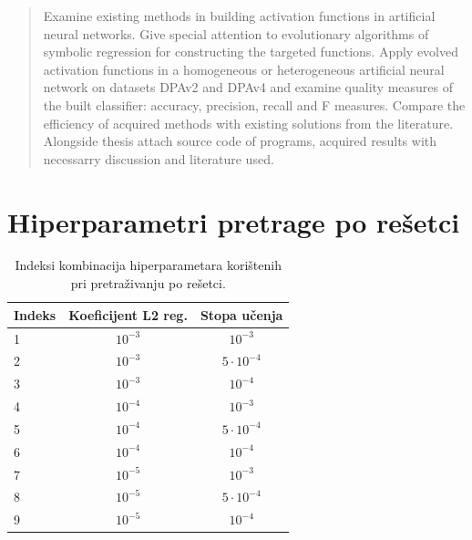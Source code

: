 \documentclass[times, utf8, numeric, diplomski]{fer}
\begin{document}
\begin{abstract}
Examine existing methods in building activation functions in artificial neural networks. Give special attention to evolutionary algorithms of symbolic regression for constructing the targeted functions. Apply evolved activation functions in a homogeneous or heterogeneous artificial neural network on datasets DPAv2 and DPAv4 and examine quality measures of the built classifier: accuracy, precision, recall and F measures. Compare the efficiency of acquired methods with existing solutions from the literature. Alongside thesis attach source code of programs, acquired results with necessarry discussion and literature used.

\end{abstract}

\iffalse %
\appendix
\chapter{Hiperparametri pretrage po rešetci}
\label{app:grid_hp}

\begin{table}[H]
\centering
\begin{tabular}{lcc}
Indeks & Koeficijent L2 reg. & Stopa učenja \\
\hline
1 & $10^{-3}$ & $10^{-3}$  \\
2 & $10^{-3}$ & $5 \cdot 10^{-4}$ \\
3 & $10^{-3}$ & $10^{-4}$ \\
4 & $10^{-4}$ & $10^{-3}$ \\
5 & $10^{-4}$ & $5 \cdot 10^{-4}$ \\
6 & $10^{-4}$ & $10^{-4}$ \\
7 & $10^{-5}$ & $10^{-3}$ \\
8 & $10^{-5}$ & $5 \cdot 10^{-4}$ \\
9 & $10^{-5}$ & $10^{-4}$
\end{tabular}
\caption{Indeksi kombinacija hiperparametara korištenih pri pretraživanju po rešetci.}
\label{tab:hp_comb}
\end{table}
\end{document}
